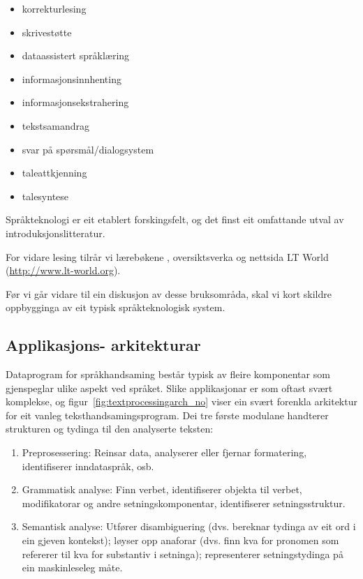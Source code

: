 \begin{multicols}{2}
\begin{itemize}
\item korrekturlesing
\item skrivestøtte
\item dataassistert språklæring
\item informasjonsinnhenting  
\item informasjonsekstrahering
\item tekstsamandrag
\item svar på spørsmål/dialogsystem
\item taleattkjenning 
\item talesyntese 
\end{itemize}

Språkteknologi er eit etablert forskingsfelt, og det finst eit omfattande utval av introduksjonslitteratur.

For vidare lesing tilrår vi lærebøkene \cite{jurafsky-martin01, manning-schuetze1}, oversiktsverka \cite{lt-survey1} og nettsida LT World (\url{http://www.lt-world.org}).

Før vi går vidare til ein diskusjon av desse bruksområda, skal vi kort skildre oppbygginga av eit typisk språkteknologisk system. 

\subsection[Applikasjonsarkitekturar]{Applikasjons- arkitekturar}

Dataprogram for språkhandsaming består typisk av fleire komponentar som gjenspeglar ulike aspekt ved språket. Slike applikasjonar er som oftast svært komplekse, og figur~\ref{fig:textprocessingarch_no} viser ein svært forenkla arkitektur for eit vanleg teksthandsamingsprogram. Dei tre første modulane handterer strukturen og tydinga til den analyserte teksten:

\begin{enumerate}
\item Preprosessering: Reinsar data, analyserer eller fjernar formatering, identifiserer inndataspråk, osb. 
\item Grammatisk analyse: Finn verbet, identifiserer objekta til verbet, modifikatorar og andre setningskomponentar, identifiserer setningsstruktur. 
\item Semantisk analyse: Utfører disambiguering (dvs. bereknar tydinga av eit ord i ein gjeven kontekst); løyser opp anaforar (dvs. finn kva for pronomen som refererer til kva for substantiv i setninga); representerer setningstydinga på ein maskinleseleg måte.
\end{enumerate}


\end{multicols}
